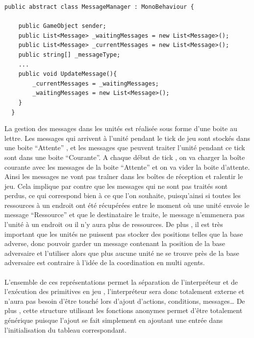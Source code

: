 \documentclass{report}
\begin{document}
\begin{lstlisting}[frame=single]
public abstract class MessageManager : MonoBehaviour {

    public GameObject sender;
    public List<Message> _waitingMessages = new List<Message>();
    public List<Message> _currentMessages = new List<Message>();
    public string[] _messageType;
    ...
    public void UpdateMessage(){
        _currentMessages = _waitingMessages;
        _waitingMessages = new List<Message>();
    }
  }    
\end{lstlisting}

La gestion des messages dans les unités est réalisée sous forme d’une boite au lettre. Les messages qui arrivent à l’unité pendant le tick  de jeu sont stockés dans une boite “Attente” , et les messages que peuvent traiter l’unité pendant ce tick sont dans une boite “Courante”. A chaque début de tick , on va charger la boîte courante avec les messages de la boite “Attente” et on va vider la boite d’attente. Ainsi les messages ne vont pas traîner dans les boîtes de réception et ralentir le jeu. Cela implique par contre que les messages qui ne sont pas traités sont perdus, ce qui correspond bien à ce que l’on souhaite, puisqu’ainsi si toutes les ressources à un endroit ont été récupérées entre le moment où une unité envoie le message “Ressource” et que le destinataire le traite, le message n’emmenera pas l’unité à un endroit ou il n’y aura plus de ressources. De plus , il est très important que les unités ne puissent pas stocker des positions telles que la base adverse, donc pouvoir garder un message contenant la position de la base adversaire et l’utiliser alors que plus aucune unité ne se trouve près de la base adversaire est contraire à l’idée de la coordination en multi agents.
\paragraph{}

L’ensemble de ces représentations permet la séparation de l’interpréteur et de l'exécution des primitives en jeu , l’interpréteur sera donc totalement externe et n’aura pas besoin d’être touché lors d’ajout d’actions, conditions, messages…
De plus , cette structure utilisant les fonctions anonymes permet d'être totalement générique puisque l’ajout se fait simplement en ajoutant une entrée dans l’initialisation du tableau correspondant.
\paragraph{}
\end{document}
